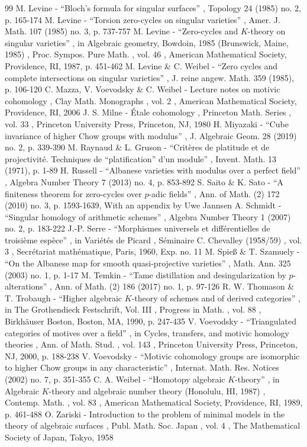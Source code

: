 \documentclass[11pt]{article}
\numberwithin{equation}{section}
\theoremstyle{definition}
\begin{document}
\begin{thebibliography}{99}
 M. Levine - “Bloch’s formula for singular surfaces” , Topology 24 (1985) no. 2, p. 165-174
 M. Levine - “Torsion zero-cycles on singular varieties” , Amer. J. Math. 107 (1985) no. 3, p. 737-757
 M. Levine - “Zero-cycles and $K$-theory on singular varieties” , in Algebraic geometry, Bowdoin, 1985 (Brunswick, Maine, 1985) , Proc. Sympos. Pure Math. , vol. 46 , American Mathematical Society, Providence, RI, 1987, p. 451-462
 M. Levine \& C. Weibel - “Zero cycles and complete intersections on singular varieties” , J. reine angew. Math. 359 (1985), p. 106-120
 C. Mazza, V. Voevodsky \& C. Weibel - Lecture notes on motivic cohomology , Clay Math. Monographs , vol. 2 , American Mathematical Society, Providence, RI, 2006
 J. S. Milne - Étale cohomology , Princeton Math. Series , vol. 33 , Princeton University Press, Princeton, NJ, 1980
 H. Miyazaki - “Cube invariance of higher Chow groups with modulus” , J. Algebraic Geom. 28 (2019) no. 2, p. 339-390
 M. Raynaud \& L. Gruson - “Critères de platitude et de projectivité. Techniques de “platification” d’un module” , Invent. Math. 13 (1971), p. 1-89
 H. Russell - “Albanese varieties with modulus over a perfect field” , Algebra Number Theory 7 (2013) no. 4, p. 853-892
 S. Saito \& K. Sato - “A finiteness theorem for zero-cycles over $p$-adic fields” , Ann. of Math. (2) 172 (2010) no. 3, p. 1593-1639, With an appendix by Uwe Jannsen
 A. Schmidt - “Singular homology of arithmetic schemes” , Algebra Number Theory 1 (2007) no. 2, p. 183-222
 J.-P. Serre - “Morphismes universels et différentielles de troisième espèce” , in Variétés de Picard , Séminaire C. Chevalley (1958/59) , vol. 3 , Secrétariat mathématique, Paris, 1960, Exp. no. 11
 M. Spieß \& T. Szamuely - “On the Albanese map for smooth quasi-projective varieties” , Math. Ann. 325 (2003) no. 1, p. 1-17
 M. Temkin - “Tame distillation and desingularization by $p$-alterations” , Ann. of Math. (2) 186 (2017) no. 1, p. 97-126
 R. W. Thomason \& T. Trobaugh - “Higher algebraic $K$-theory of schemes and of derived categories” , in The Grothendieck Festschrift, Vol. III , Progress in Math. , vol. 88 , Birkhäuser Boston, Boston, MA, 1990, p. 247-435
 V. Voevodsky - “Triangulated categories of motives over a field” , in Cycles, transfers, and motivic homology theories , Ann. of Math. Stud. , vol. 143 , Princeton University Press, Princeton, NJ, 2000, p. 188-238
 V. Voevodsky - “Motivic cohomology groups are isomorphic to higher Chow groups in any characteristic” , Internat. Math. Res. Notices (2002) no. 7, p. 351-355
 C. A. Weibel - “Homotopy algebraic $K$-theory” , in Algebraic $K$-theory and algebraic number theory (Honolulu, HI, 1987) , Contemp. Math. , vol. 83 , American Mathematical Society, Providence, RI, 1989, p. 461-488
 O. Zariski - Introduction to the problem of minimal models in the theory of algebraic surfaces , Publ. Math. Soc. Japan , vol. 4 , The Mathematical Society of Japan, Tokyo, 1958
\end{thebibliography}
\end{document}
